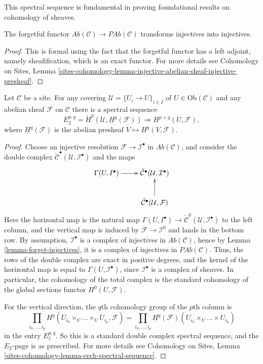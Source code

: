 \noindent
This spectral sequence is fundamental in proving foundational results on
cohomology of sheaves.

\begin{lemma}
\label{lemma-forget-injectives}
The forgetful functor $\textit{Ab}(\mathcal{C})\to \textit{PAb}(\mathcal{C})$
transforms injectives into injectives.
\end{lemma}

\begin{proof}
This is formal using the fact that the forgetful functor has a left adjoint,
namely sheafification, which is an exact functor. For more details see
Cohomology on Sites,
Lemma \ref{sites-cohomology-lemma-injective-abelian-sheaf-injective-presheaf}.
\end{proof}

\begin{theorem}
\label{theorem-cech-ss}
Let $\mathcal{C}$ be a site. For any covering
$\mathcal{U} = \{U_i \to U\}_{i \in I}$ of $U \in \text{Ob}(\mathcal{C})$
and any abelian sheaf $\mathcal{F}$ on $\mathcal{C}$
there is a spectral sequence
$$
E_2^{p, q}
=
\check H^p(\mathcal{U}, \underline{H}^q(\mathcal{F}))
\Rightarrow
H^{p+q}(U, \mathcal{F}),
$$
where $\underline{H}^q(\mathcal{F})$ is the abelian presheaf
$V \mapsto H^q(V, \mathcal{F})$.
\end{theorem}

\begin{proof}
Choose an injective resolution $\mathcal{F}\to \mathcal{I}^\bullet$ in
$\textit{Ab}(\mathcal{C})$, and consider the double complex
$\check{\mathcal{C}}^\bullet(\mathcal{U}, \mathcal{I}^\bullet)$
and the maps
$$
\xymatrix{
\Gamma(U, I^\bullet) \ar[r] &
\check{\mathcal{C}}^\bullet(\mathcal{U}, \mathcal{I}^\bullet) \\
& \check{\mathcal{C}}^\bullet(\mathcal{U}, \mathcal{F}) \ar[u]
}
$$
Here the horizontal map is the natural map
$\Gamma(U, I^\bullet) \to
\check{\mathcal{C}}^0(\mathcal{U}, \mathcal{I}^\bullet)$
to the left column, and the vertical map is induced by
$\mathcal{F}\to \mathcal{I}^0$ and lands in the bottom row.
By assumption, $\mathcal{I}^\bullet$ is a complex of injectives in
$\textit{Ab}(\mathcal{C})$, hence by
Lemma \ref{lemma-forget-injectives}, it is a complex of injectives in
$\textit{PAb}(\mathcal{C})$. Thus, the rows of the double complex are exact in
positive degrees, and the kernel of the horizontal map is equal to
$\Gamma(U, \mathcal{I}^\bullet)$, since $\mathcal{I}^\bullet$
is a complex of sheaves. In particular, the cohomology of the total complex
is the standard
cohomology of the global sections functor $H^0(U, \mathcal{F})$.

\medskip\noindent
For the vertical direction, the $q$th cohomology group of the $p$th column is
$$
\prod_{i_0, \ldots, i_p}
H^q(U_{i_0} \times_U \ldots \times_U U_{i_p}, \mathcal{F})
=
\prod_{i_0, \dots, i_p}
\underline{H}^q(\mathcal{F})(U_{i_0}\times_U \ldots \times U_{i_p})
$$
in the entry $E_1^{p,q}$. So this is a standard double complex spectral
sequence, and the $E_2$-page is as prescribed. For more details see
Cohomology on Sites,
Lemma \ref{sites-cohomology-lemma-cech-spectral-sequence}.
\end{proof}

